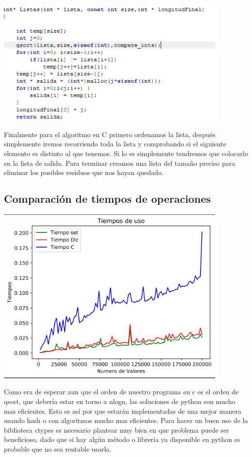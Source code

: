 \documentclass{article}
\begin{document}
\includegraphics[width=11.5cm]{C.PNG}

Finalmente para el algoritmo en C primero ordenamos la lista, después simplemente iremos recorriendo toda la lista y comprobando si el siguiente elemento es distinto al que tenemos. Si lo es simplemente tendremos que colocarlo en la lista de salida. Para terminar creamos una lista del tamaño preciso para eliminar los posibles residuos que nos hayan quedado.

\subsection{Comparación de tiempos de operaciones}
\includegraphics[width=11.5cm]{PDF.PNG}

Como era de esperar aun que el orden de nuestro programa en c es el orden de qsort, que debería estar en torno a nlogn, las soluciones de python son mucho mas eficientes. Esto es así por que estarán implementadas de una mejor manera usando hash o con algoritmos mucho mas eficientes. Para hacer un buen uso de la biblioteca ctypes es necesario plantear muy bien en que problema puede ser beneficioso, dado que si hay algún método o librería ya disponible en python es probable que no sea rentable usarla.
\end{document}
